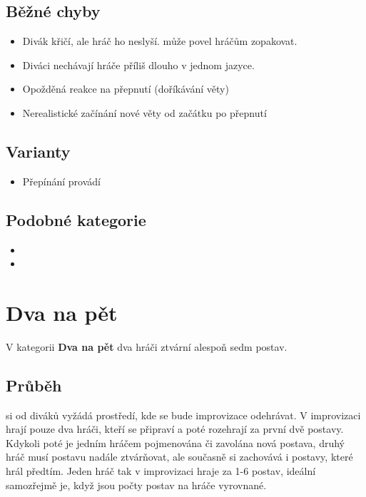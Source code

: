 \documentclass[main.tex]{subfiles}
\begin{document}
\subsection{Běžné chyby} \begin{itemize}
\item Divák křičí, ale hráč ho neslyší.  může povel hráčům zopakovat.
\item Diváci nechávají hráče příliš dlouho v jednom jazyce.
\item Opožděná reakce na přepnutí (doříkávání věty)
\item Nerealistické začínání nové věty od začátku po přepnutí
\end{itemize}
 
\subsection{Varianty} \begin{itemize}
\item Přepínání provádí 
\end{itemize}
 
\subsection{Podobné kategorie} \begin{itemize}
\item  {}
\item  {}
\end{itemize}
 
 
 
 
\needspace{5cm} \section{Dva na pět} \label{dva na pět}  
 
V kategorii \textbf{Dva na pět}{} dva hráči ztvární alespoň sedm postav. 
 
\subsection{Průběh}  si od diváků vyžádá prostředí, kde se bude improvizace odehrávat. V improvizaci hrají pouze dva hráči, kteří se připraví a poté rozehrají za první dvě postavy. Kdykoli poté je jedním hráčem pojmenována či zavolána nová postava, druhý hráč musí postavu nadále ztvárňovat, ale současně si zachovává i postavy, které hrál předtím. Jeden hráč tak v improvizaci hraje za 1-6 postav, ideální samozřejmě je, když jsou počty postav na hráče vyrovnané. 
 
\end{document}
